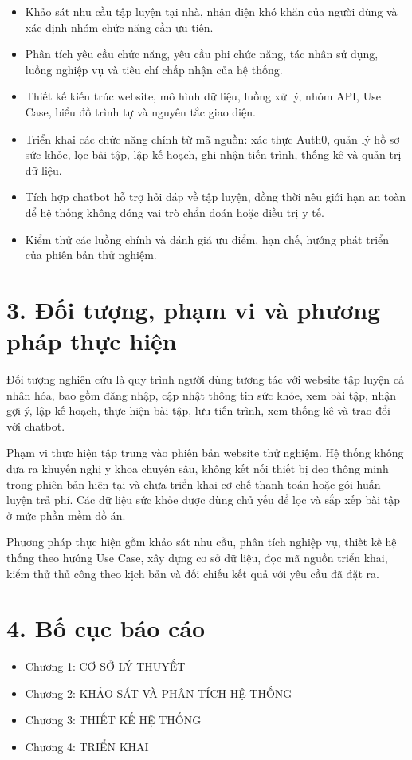 \begin{itemize}

    \item Khảo sát nhu cầu tập luyện tại nhà, nhận diện khó khăn của người dùng và xác định nhóm chức năng cần ưu tiên.

    \item Phân tích yêu cầu chức năng, yêu cầu phi chức năng, tác nhân sử dụng, luồng nghiệp vụ và tiêu chí chấp nhận của hệ thống.

    \item Thiết kế kiến trúc website, mô hình dữ liệu, luồng xử lý, nhóm API, Use Case, biểu đồ trình tự và nguyên tắc giao diện.

    \item Triển khai các chức năng chính từ mã nguồn: xác thực Auth0, quản lý hồ sơ sức khỏe, lọc bài tập, lập kế hoạch, ghi nhận tiến trình, thống kê và quản trị dữ liệu.

    \item Tích hợp chatbot hỗ trợ hỏi đáp về tập luyện, đồng thời nêu giới hạn an toàn để hệ thống không đóng vai trò chẩn đoán hoặc điều trị y tế.

    \item Kiểm thử các luồng chính và đánh giá ưu điểm, hạn chế, hướng phát triển của phiên bản thử nghiệm.

\end{itemize}

\section*{3. Đối tượng, phạm vi và phương pháp thực hiện}

Đối tượng nghiên cứu là quy trình người dùng tương tác với website tập luyện cá nhân hóa, bao gồm đăng nhập, cập nhật thông tin sức khỏe, xem bài tập, nhận gợi ý, lập kế hoạch, thực hiện bài tập, lưu tiến trình, xem thống kê và trao đổi với chatbot.


Phạm vi thực hiện tập trung vào phiên bản website thử nghiệm. Hệ thống không đưa ra khuyến nghị y khoa chuyên sâu, không kết nối thiết bị đeo thông minh trong phiên bản hiện tại và chưa triển khai cơ chế thanh toán hoặc gói huấn luyện trả phí. Các dữ liệu sức khỏe được dùng chủ yếu để lọc và sắp xếp bài tập ở mức phần mềm đồ án.


Phương pháp thực hiện gồm khảo sát nhu cầu, phân tích nghiệp vụ, thiết kế hệ thống theo hướng Use Case, xây dựng cơ sở dữ liệu, đọc mã nguồn triển khai, kiểm thử thủ công theo kịch bản và đối chiếu kết quả với yêu cầu đã đặt ra.


\section*{4. Bố cục báo cáo}

\begin{itemize}

    \item Chương 1: CƠ SỞ LÝ THUYẾT

    \item Chương 2: KHẢO SÁT VÀ PHÂN TÍCH HỆ THỐNG

    \item Chương 3: THIẾT KẾ HỆ THỐNG

    \item Chương 4: TRIỂN KHAI

\end{itemize}
